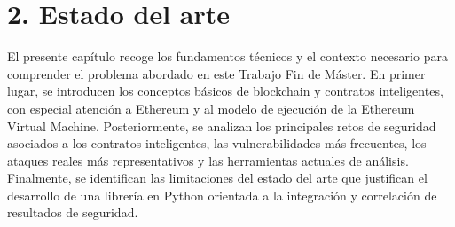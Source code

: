 \section{2. Estado del arte}\label{estado-del-arte}

El presente capítulo recoge los fundamentos técnicos y el contexto
necesario para comprender el problema abordado en este Trabajo Fin de
Máster. En primer lugar, se introducen los conceptos básicos de
blockchain y contratos inteligentes, con especial atención a Ethereum y
al modelo de ejecución de la Ethereum Virtual Machine. Posteriormente,
se analizan los principales retos de seguridad asociados a los contratos
inteligentes, las vulnerabilidades más frecuentes, los ataques reales
más representativos y las herramientas actuales de análisis. Finalmente,
se identifican las limitaciones del estado del arte que justifican el
desarrollo de una librería en Python orientada a la integración y
correlación de resultados de seguridad.
